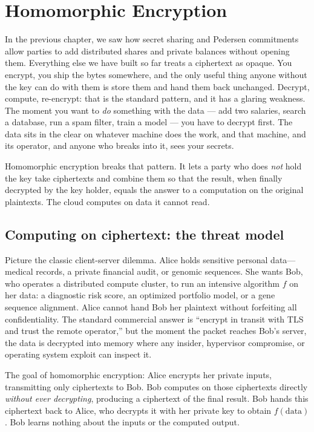 \chapter{Homomorphic Encryption}

In the previous chapter, we saw how secret sharing and Pedersen commitments allow parties to add distributed shares and private balances without opening them. Everything else we have built so far treats a ciphertext as opaque. You encrypt, you ship the bytes somewhere, and the only useful thing anyone without the key can do with them is store them and hand them back unchanged. Decrypt, compute, re-encrypt: that is the standard pattern, and it has a glaring weakness. The moment you want to \emph{do} something with the data --- add two salaries, search a database, run a spam filter, train a model --- you have to decrypt first. The data sits in the clear on whatever machine does the work, and that machine, and its operator, and anyone who breaks into it, sees your secrets.

Homomorphic encryption breaks that pattern. It lets a party who does \emph{not} hold the key take ciphertexts and combine them so that the result, when finally decrypted by the key holder, equals the answer to a computation on the original plaintexts. The cloud computes on data it cannot read. 

\chapterline

\section{Computing on ciphertext: the threat model}
\label{ch33:threat-model}

Picture the classic client-server dilemma. Alice holds sensitive personal data---medical records, a private financial audit, or genomic sequences. She wants Bob, who operates a distributed compute cluster, to run an intensive algorithm $f$ on her data: a diagnostic risk score, an optimized portfolio model, or a gene sequence alignment. Alice cannot hand Bob her plaintext without forfeiting all confidentiality. The standard commercial answer is ``encrypt in transit with TLS and trust the remote operator,'' but the moment the packet reaches Bob's server, the data is decrypted into memory where any insider, hypervisor compromise, or operating system exploit can inspect it.

\begin{focusbox}
The goal of homomorphic encryption: Alice encrypts her private inputs, transmitting only ciphertexts to Bob. Bob computes on those ciphertexts directly \emph{without ever decrypting}, producing a ciphertext of the final result. Bob hands this ciphertext back to Alice, who decrypts it with her private key to obtain $f(\text{data})$. Bob learns nothing about the inputs or the computed output.
\end{focusbox}


